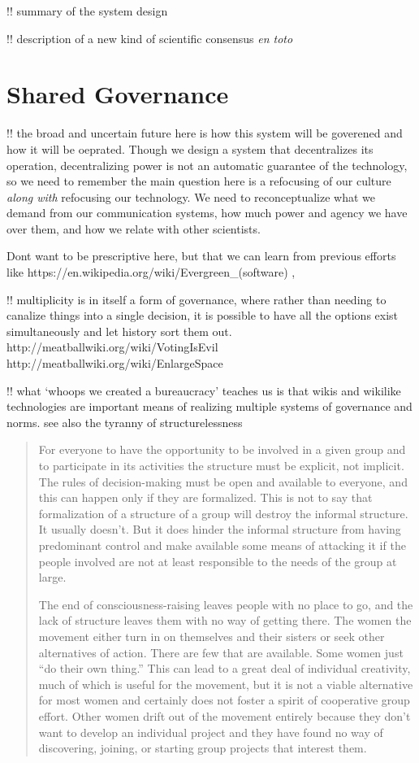 \documentclass[notoc]{tufte-book}
\begin{document}
 !! summary of the system design

!! description of a new kind of scientific consensus \emph{en toto}


\section{Shared Governance}

!! the broad and uncertain future here is how this system will be
goverened and how it will be oeprated. Though we design a system that
decentralizes its operation, decentralizing power is not an automatic
guarantee of the technology, so we need to remember the main question
here is a refocusing of our culture \emph{along with} refocusing our
technology. We need to reconceptualize what we demand from our
communication systems, how much power and agency we have over them, and
how we relate with other scientists.

Dont want to be prescriptive here, but that we can learn from previous
efforts like https://en.wikipedia.org/wiki/Evergreen\_(software) ,

!! multiplicity is in itself a form of governance, where rather than
needing to canalize things into a single decision, it is possible to
have all the options exist simultaneously and let history sort them out.
http://meatballwiki.org/wiki/VotingIsEvil
http://meatballwiki.org/wiki/EnlargeSpace

!! what `whoops we created a bureaucracy' teaches us is that wikis and
wikilike technologies are important means of realizing multiple systems
of governance and norms. see also the tyranny of structurelessness

\begin{quote}
For everyone to have the opportunity to be involved in a given group and
to participate in its activities the structure must be explicit, not
implicit. The rules of decision-making must be open and available to
everyone, and this can happen only if they are formalized. This is not
to say that formalization of a structure of a group will destroy the
informal structure. It usually doesn't. But it does hinder the informal
structure from having predominant control and make available some means
of attacking it if the people involved are not at least responsible to
the needs of the group at large.

The end of consciousness-raising leaves people with no place to go, and
the lack of structure leaves them with no way of getting there. The
women the movement either turn in on themselves and their sisters or
seek other alternatives of action. There are few that are available.
Some women just ``do their own thing.'' This can lead to a great deal of
individual creativity, much of which is useful for the movement, but it
is not a viable alternative for most women and certainly does not foster
a spirit of cooperative group effort. Other women drift out of the
movement entirely because they don't want to develop an individual
project and they have found no way of discovering, joining, or starting
group projects that interest them. \citep{freemanTyrannyStucturelessness1970} 
\end{quote}
\end{document}

